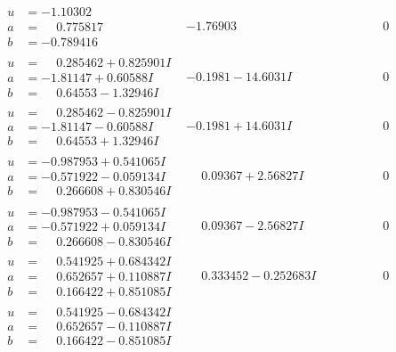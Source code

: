 \documentclass[1p]{elsarticle_modified}
\theoremstyle{definition}
\begin{document}
$$\begin{array}{c|c|c}
\begin{aligned}
u &= -1.10302\phantom{ +0.000000I} \\
a &= \phantom{-}0.775817\phantom{ +0.000000I} \\
b &= -0.789416\phantom{ +0.000000I}\end{aligned}
 & -1.76903\phantom{ +0.000000I} & \phantom{-0.000000 } 0 \\ \hline\begin{aligned}
u &= \phantom{-}0.285462 + 0.825901 I \\
a &= -1.81147 + 0.60588 I \\
b &= \phantom{-}0.64553 - 1.32946 I\end{aligned}
 & -0.1981 - 14.6031 I & \phantom{-0.000000 } 0 \\ \hline\begin{aligned}
u &= \phantom{-}0.285462 - 0.825901 I \\
a &= -1.81147 - 0.60588 I \\
b &= \phantom{-}0.64553 + 1.32946 I\end{aligned}
 & -0.1981 + 14.6031 I & \phantom{-0.000000 } 0 \\ \hline\begin{aligned}
u &= -0.987953 + 0.541065 I \\
a &= -0.571922 - 0.059134 I \\
b &= \phantom{-}0.266608 + 0.830546 I\end{aligned}
 & \phantom{-}0.09367 + 2.56827 I & \phantom{-0.000000 } 0 \\ \hline\begin{aligned}
u &= -0.987953 - 0.541065 I \\
a &= -0.571922 + 0.059134 I \\
b &= \phantom{-}0.266608 - 0.830546 I\end{aligned}
 & \phantom{-}0.09367 - 2.56827 I & \phantom{-0.000000 } 0 \\ \hline\begin{aligned}
u &= \phantom{-}0.541925 + 0.684342 I \\
a &= \phantom{-}0.652657 + 0.110887 I \\
b &= \phantom{-}0.166422 + 0.851085 I\end{aligned}
 & \phantom{-}0.333452 - 0.252683 I & \phantom{-0.000000 } 0 \\ \hline\begin{aligned}
u &= \phantom{-}0.541925 - 0.684342 I \\
a &= \phantom{-}0.652657 - 0.110887 I \\
b &= \phantom{-}0.166422 - 0.851085 I\end{aligned}

\end{array}$$
\end{document}
